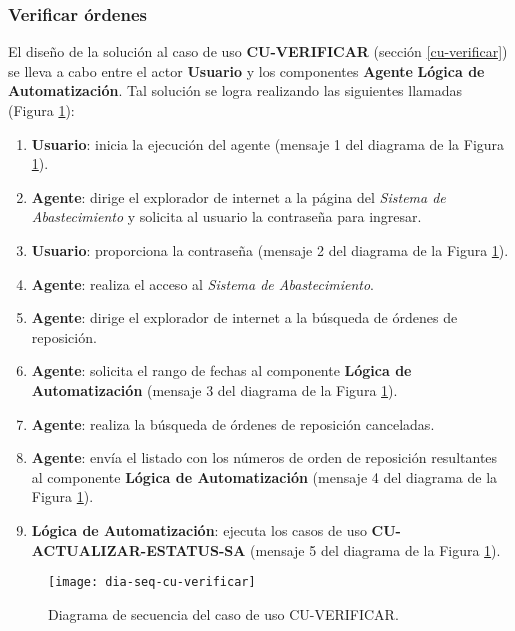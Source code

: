 \subsubsection{Verificar órdenes}
El diseño de la solución al caso de uso \textbf{CU-VERIFICAR} (sección \ref{cu-verificar}) se lleva a cabo entre el actor \textbf{Usuario} y los componentes \textbf{Agente} \textbf{Lógica de Automatización}. Tal solución se logra realizando las siguientes llamadas (Figura \ref{fig:dia-seq-cu-verificar}):
\begin{enumerate}
	\item \textbf{Usuario}: inicia la ejecución del agente (mensaje 1 del diagrama de la Figura \ref{fig:dia-seq-cu-verificar}).
	\item \textbf{Agente}: dirige el explorador de internet a la página del \textit{Sistema de Abastecimiento} y solicita al usuario la contraseña para ingresar.
	\item \textbf{Usuario}: proporciona la contraseña (mensaje 2 del diagrama de la Figura \ref{fig:dia-seq-cu-verificar}).
	\item \textbf{Agente}: realiza el acceso al \textit{Sistema de Abastecimiento}.
	\item \textbf{Agente}: dirige el explorador de internet a la búsqueda de órdenes de reposición.
	\item \textbf{Agente}: solicita el rango de fechas al componente \textbf{Lógica de Automatización} (mensaje 3 del diagrama de la Figura \ref{fig:dia-seq-cu-verificar}).
	\item \textbf{Agente}: realiza la búsqueda de órdenes de reposición canceladas.
	\item \textbf{Agente}: envía el listado con los números de orden de reposición resultantes al componente \textbf{Lógica de Automatización} (mensaje 4 del diagrama de la Figura \ref{fig:dia-seq-cu-verificar}).
	\item \textbf{Lógica de Automatización}: ejecuta los casos de uso \textbf{CU-ACTUALIZAR-ESTATUS-SA} (mensaje 5 del diagrama de la Figura \ref{fig:dia-seq-cu-verificar}).
\end{enumerate}
\begin{figure}[h]
	\centering
	\texttt{[image: dia-seq-cu-verificar]}
	\caption{Diagrama de secuencia del caso de uso CU-VERIFICAR.}
	\label{fig:dia-seq-cu-verificar}
\end{figure}
